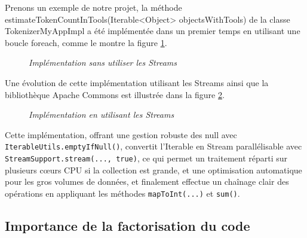 \documentclass[12pt,a4paper]{report}
\begin{document}
	
	
	Prenons un exemple de notre projet, la méthode \\ estimateTokenCountInTools(Iterable<Object> objectsWithTools) de la classe TokenizerMyAppImpl a été implémentée dans un premier temps en utilisant une boucle foreach, comme le montre la figure \ref{fig:before-stream}.
	
	\begin{figure}[H]
		\centering
		\caption{\textit{Implémentation sans utiliser les Streams}}
		\label{fig:before-stream}
	\end{figure}
	
	Une évolution de cette implémentation utilisant les Streams ainsi que la bibliothèque Apache Commons est illustrée dans la figure \ref{fig:after-stream}.
	
	\begin{figure}[H]
		\centering
		\caption{\textit{Implémentation en utilisant les Streams}}
		\label{fig:after-stream}
	\end{figure}
	
	Cette implémentation, offrant une gestion robuste des null avec \verb|IterableUtils.emptyIfNull()|, convertit l'Iterable en Stream parallélisable avec \verb|StreamSupport.stream(..., true)|, ce qui permet un traitement réparti sur plusieurs cœurs CPU si la collection est grande, et une optimisation automatique pour les gros volumes de données, et finalement effectue un chaînage clair des opérations en appliquant les méthodes \verb|mapToInt(...)| et \verb|sum()|.
	
	\subsection{Importance de la factorisation du code}
	
\end{document}

